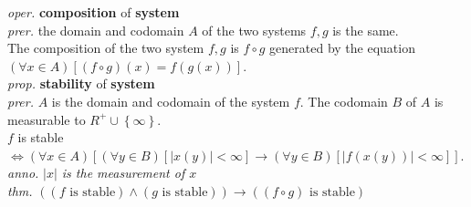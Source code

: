 \documentclass{article}
\newcommand{\sd}[1]{{\left(#1\right)}}
\newcommand{\thm}[1]{\emph{thm.} #1}
\newcommand{\anno}[1]{\emph{anno.} \emph{#1}}
\newcommand{\md}[1]{{\left[#1\right]}}
\newcommand{\ld}[1]{{\left\{#1\right\}}}
\newcommand{\prer}[1]{\emph{prer.} #1}
\newcommand{\oper}[2]{\emph{oper.} \textbf{#1} of \textbf{#2}}
\newcommand{\prop}[2]{\emph{prop.} \textbf{#1} of \textbf{#2}}
\newcommand{\abs}[1]{{\left|#1\right|}}
\begin{document}
\oper{composition}{system}\\
\prer{the domain and codomain $A$ of the two systems $f,g$ is the same.}\\
The composition of the two system $f,g$ is $f\circ g$ generated by the equation $\sd{\forall x \in A}\md{\sd{f\circ g}\sd{x} = f\sd{g\sd{x}}}$.\\
\prop{stability}{system}\\
\prer{$A$ is the domain and codomain of the system $f$. The codomain $B$ of $A$ is measurable to $R^{+}\cup\ld{\infty}$.}\\
$f$ is stable $\iff \sd{\forall x \in A}\md{\sd{\forall y \in B}\md{\abs{x\sd{y}} < \infty} \to \sd{\forall y \in B}\md{\abs{f\sd{x\sd{y}}} < \infty}}$.\\
\anno{$\abs{x}$ is the measurement of $x$}\\
\thm{$\sd{\sd{f\text{ is stable}}\land\sd{g\text{ is stable}}} \to \sd{\sd{f \circ g}\text{ is stable}}$}\\
\end{document}
